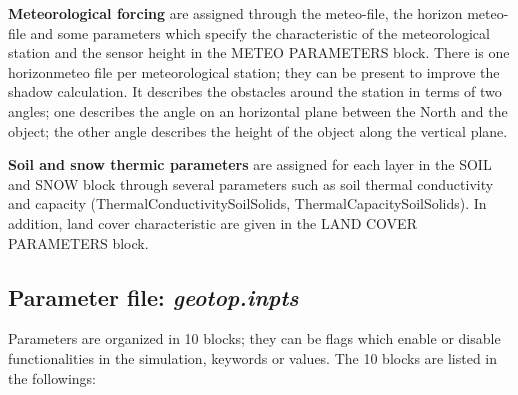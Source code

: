{\bf Meteorological forcing} are assigned through the meteo-file, the horizon meteo-file and some parameters which specify the characteristic of the meteorological station and the sensor height in the METEO PARAMETERS block. There is one horizonmeteo file per meteorological station; they can be present to improve the shadow calculation.  It describes the obstacles around the station in terms of two angles; one describes the angle on an horizontal plane between the North and the object; the other angle describes the height of the object along the vertical plane.

{\bf Soil and snow thermic parameters} are assigned for each layer in the SOIL and SNOW block through several parameters such as soil thermal conductivity and capacity (ThermalConductivitySoilSolids, ThermalCapacitySoilSolids).
In addition, land cover characteristic are given in the LAND COVER PARAMETERS block.

\subsection{Parameter file: {\it geotop.inpts}}

Parameters are organized in 10 blocks; they can be flags which enable or disable functionalities in the simulation, keywords or values. The 10 blocks are listed in the followings:
 
